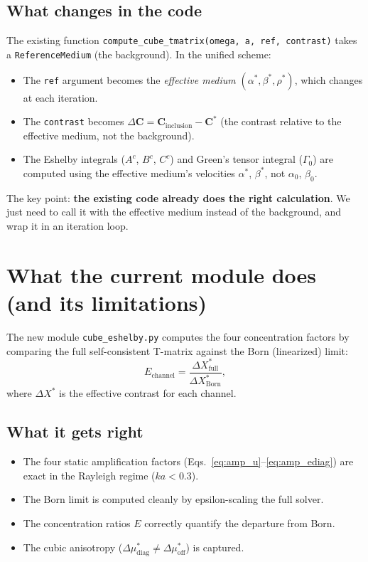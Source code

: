 \documentclass[11pt,a4paper]{article}
\newcommand{\D}{\Delta}
\newcommand{\bC}{\bm{C}}
\begin{document}
\subsection{What changes in the code}

The existing function \texttt{compute\_cube\_tmatrix(omega, a, ref,
contrast)} takes a \texttt{ReferenceMedium} (the background).  In the
unified scheme:
\begin{itemize}[nosep]
  \item The \texttt{ref} argument becomes the \emph{effective medium}
    $(\alpha^*, \beta^*, \rho^*)$, which changes at each iteration.
  \item The \texttt{contrast} becomes $\D\bC = \bC_{\text{inclusion}}
    - \bC^*$ (the contrast relative to the effective medium, not the
    background).
  \item The Eshelby integrals ($A^c$, $B^c$, $C^c$) and Green's
    tensor integral ($\Gamma_0$) are computed using the effective
    medium's velocities $\alpha^*$, $\beta^*$, not $\alpha_0$,
    $\beta_0$.
\end{itemize}
The key point: \textbf{the existing code already does the right
calculation}.  We just need to call it with the effective medium
instead of the background, and wrap it in an iteration loop.

\section{What the current module does (and its limitations)}
\label{sec:current}

The new module \texttt{cube\_eshelby.py} computes the four
concentration factors by comparing the full self-consistent T-matrix
against the Born (linearized) limit:
\begin{equation}
  E_{\text{channel}} = \frac{\D X^*_{\text{full}}}{\D X^*_{\text{Born}}},
\end{equation}
where $\D X^*$ is the effective contrast for each channel.

\subsection{What it gets right}

\begin{itemize}[nosep]
  \item The four static amplification factors
    (Eqs.~\ref{eq:amp_u}--\ref{eq:amp_ediag}) are exact in the
    Rayleigh regime ($ka < 0.3$).
  \item The Born limit is computed cleanly by epsilon-scaling the
    full solver.
  \item The concentration ratios $E$ correctly quantify the
    departure from Born.
  \item The cubic anisotropy
    ($\D\mu^*_{\text{diag}} \neq \D\mu^*_{\text{off}}$) is captured.
\end{itemize}
\end{document}
